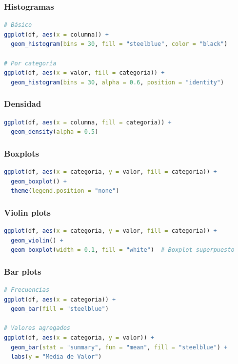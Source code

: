 \documentclass[a4paper,11pt]{article}
\begin{document}
\subsubsection{Histogramas}

\begin{lstlisting}[language=R]
# Básico
ggplot(df, aes(x = columna)) +
  geom_histogram(bins = 30, fill = "steelblue", color = "black")

# Por categoría
ggplot(df, aes(x = valor, fill = categoria)) +
  geom_histogram(bins = 30, alpha = 0.6, position = "identity")
\end{lstlisting}

\subsubsection{Densidad}

\begin{lstlisting}[language=R]
ggplot(df, aes(x = columna, fill = categoria)) +
  geom_density(alpha = 0.5)
\end{lstlisting}

\subsubsection{Boxplots}

\begin{lstlisting}[language=R]
ggplot(df, aes(x = categoria, y = valor, fill = categoria)) +
  geom_boxplot() +
  theme(legend.position = "none")
\end{lstlisting}

\subsubsection{Violin plots}

\begin{lstlisting}[language=R]
ggplot(df, aes(x = categoria, y = valor, fill = categoria)) +
  geom_violin() +
  geom_boxplot(width = 0.1, fill = "white")  # Boxplot superpuesto
\end{lstlisting}

\subsubsection{Bar plots}

\begin{lstlisting}[language=R]
# Frecuencias
ggplot(df, aes(x = categoria)) +
  geom_bar(fill = "steelblue")

# Valores agregados
ggplot(df, aes(x = categoria, y = valor)) +
  geom_bar(stat = "summary", fun = "mean", fill = "steelblue") +
  labs(y = "Media de Valor")
\end{lstlisting}
\end{document}
